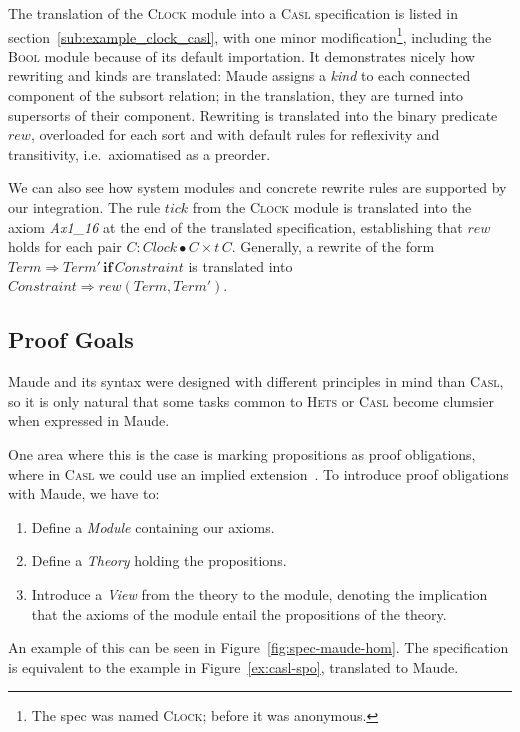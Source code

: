 \documentclass[11pt]{article}
\newcommand{\Casl}{\textsc{Casl}}
\newcommand{\Hets}{\textsc{Hets}}
\begin{document}
The translation of the \textsc{Clock} module into a \Casl{} specification is listed in section~\ref{sub:example_clock_casl}, with one minor modification\footnote{The spec was named \textsc{Clock}; before it was anonymous.}, including the \textsc{Bool} module because of its default importation. It demonstrates nicely how rewriting and kinds are translated: Maude assigns a \emph{kind} to each connected component of the subsort relation; in the translation, they are turned into supersorts of their component. Rewriting is translated into the binary predicate $rew$, overloaded for each sort and with default rules for reflexivity and transitivity, i.e.\ axiomatised as a preorder.

We can also see how system modules and concrete rewrite rules are supported by our integration. The rule $tick$ from the \textsc{Clock} module is translated into the axiom \emph{Ax1\_16} at the end of the translated specification, establishing that $rew$ holds for each pair \mbox{$C:Clock \bullet C \times t\,C$}. Generally, a rewrite of the form $Term \Rightarrow Term' \,\mathbf{if}\, Constraint$ is translated into $Constraint \Rightarrow rew(Term, Term')$.


\subsection{Proof Goals}
\label{sub:results_proof_goals}

Maude and its syntax were designed with different principles in mind than \Casl{}, so it is only natural that some tasks common to \Hets{} or \Casl{} become clumsier when expressed in Maude.

One area where this is the case is marking propositions as proof obligations, where in \Casl{} we could use an implied extension~\cite{Mosses:2004}. To introduce proof obligations with Maude, we have to:

\begin{enumerate}
  \item Define a \emph{Module} containing our axioms.
  \item Define a \emph{Theory} holding the propositions.
  \item Introduce a \emph{View} from the theory to the module, denoting the implication that the axioms of the module entail the propositions of the theory.
\end{enumerate}

An example of this can be seen in Figure~\ref{fig:spec-maude-hom}. The specification is equivalent to the example in Figure~\ref{ex:casl-spo}, translated to Maude.
\end{document}
